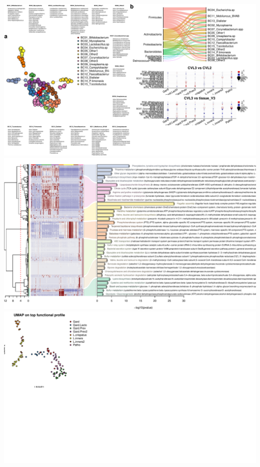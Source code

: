 \documentclass[
]{article}
\begin{document}
\includegraphics[width=1\linewidth]{manuscript_template_files/figure-latex/unnamed-chunk-6-1}
\includegraphics[width=1\linewidth]{manuscript_template_files/figure-latex/unnamed-chunk-6-2}
\includegraphics[width=1\linewidth]{manuscript_template_files/figure-latex/unnamed-chunk-6-3}
\end{document}
